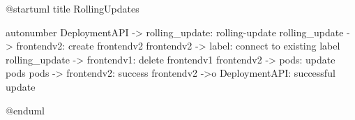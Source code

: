@startuml
title RollingUpdates

autonumber
DeploymentAPI -> rolling_update: rolling-update
rolling_update -> frontendv2: create frontendv2
frontendv2 -> label: connect to existing label
rolling_update -> frontendv1: delete frontendv1
frontendv2 -> pods: update pods
pods -> frontendv2: success
frontendv2 ->o DeploymentAPI: successful update

@enduml
